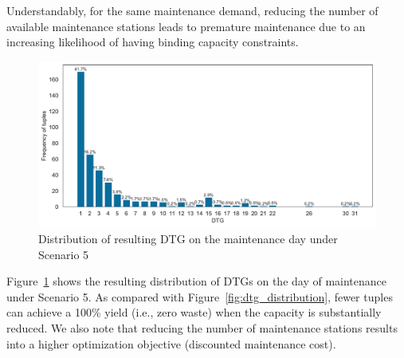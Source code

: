 Understandably, for the same maintenance demand, reducing the number of available maintenance stations leads to premature maintenance due to an increasing likelihood of having binding capacity constraints. 


\begin{figure}
    \centering
    \includegraphics[width=\linewidth]{dtg_hist_s5.pdf}
    \caption{Distribution of resulting DTG on the maintenance day under Scenario 5}
    \label{fig:scenario5DTG}
\end{figure}

Figure~\ref{fig:scenario5DTG} shows the resulting distribution of DTGs on the day of maintenance under Scenario 5. As compared with Figure~\ref{fig:dtg_distribution}, fewer tuples can achieve a 100\% yield (i.e., zero waste) when the capacity is substantially reduced. We also note that reducing the number of maintenance stations results into a higher optimization objective (discounted maintenance cost).



\begin{table}[htbp]
\centering
\caption{Effect of capacity reductions on computation time }
\label{tab:my-cap-reduction-time}
\end{table}


